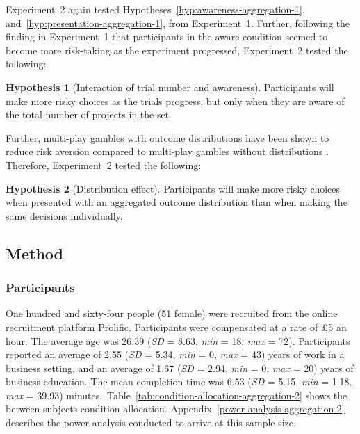 \documentclass[a4paper, nobind, dvipsnames]{templates/ociamthesis}
\theoremstyle{definition}
\theoremstyle{definition}
\theoremstyle{definition}
\theoremstyle{definition}
\newtheorem{hypothesis}{Hypothesis}[chapter]
\theoremstyle{remark}
\begin{document}
Experiment~2 again tested Hypotheses~\ref{hyp:awareness-aggregation-1},
and~\ref{hyp:presentation-aggregation-1}, from Experiment~1. Further, following
the finding in Experiment~1 that participants in the aware condition seemed to
become more risk-taking as the experiment progressed, Experiment~2 tested the
following:

\begin{hypothesis}[Interaction of trial number and awareness]
\protect\hypertarget{hyp:awareness-trials-aggregation-2}{}{\label{hyp:awareness-trials-aggregation-2} {} }Participants will make more risky choices as the trials progress, but only when
they are aware of the total number of projects in the set.
\end{hypothesis}

Further, multi-play gambles with outcome distributions have been shown to reduce
risk aversion compared to multi-play gambles without distributions \autocites[e.g.,][]{redelmeier1992,webb2017}. Therefore, Experiment~2 tested the following:

\begin{hypothesis}[Distribution effect]
\protect\hypertarget{hyp:distribution-aggregation-2}{}{\label{hyp:distribution-aggregation-2} {} }Participants will make more risky choices when presented with an aggregated
outcome distribution than when making the same decisions individually.
\end{hypothesis}

\subsection{Method}

\subsubsection{Participants}

One hundred and sixty-four people (51 female) were recruited from the online recruitment platform Prolific. Participants were compensated at a rate of £5 an hour. The average age was 26.39 (\emph{SD} = 8.63, \emph{min} = 18, \emph{max} = 72). Participants reported an average of 2.55 (\emph{SD} = 5.34, \emph{min} = 0, \emph{max} = 43) years of work in a business setting, and an average of 1.67 (\emph{SD} = 2.94, \emph{min} = 0, \emph{max} = 20) years of business education. The mean completion time was 6.53 (\emph{SD} = 5.15, \emph{min} = 1.18, \emph{max} = 39.93) minutes.~Table~\ref{tab:condition-allocation-aggregation-2}
shows the between-subjects condition allocation.
Appendix~\ref{power-analysis-aggregation-2} describes the power analysis
conducted to arrive at this sample size.
\end{document}
